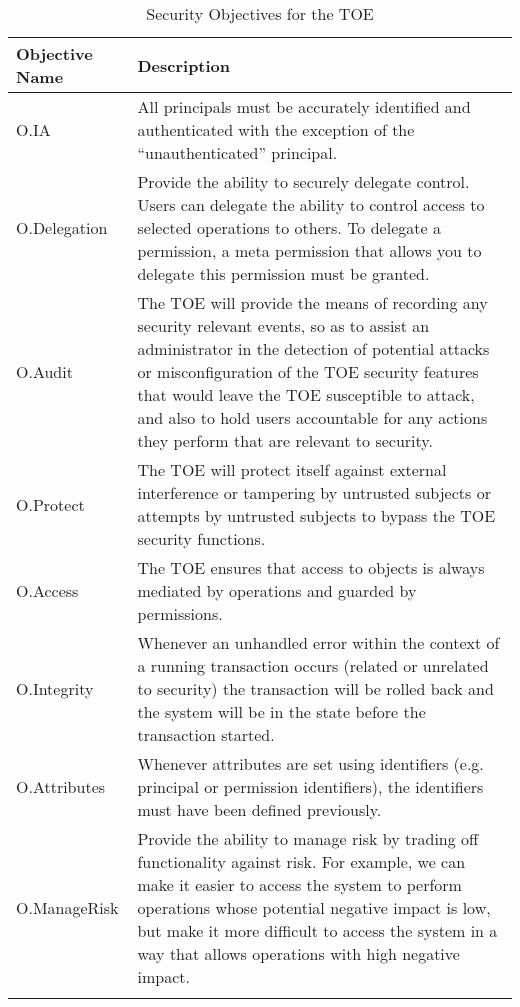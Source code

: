 \documentclass[12pt,english]{scrbook}
\begin{document}
\begin{longtable}[c]{lp{10cm}}
  \toprule
  Objective Name & Description \\
  \midrule\endhead
  
  O.IA
   & 
  All principals must be accurately identified and
  authenticated with the exception of the ``unauthenticated''
  principal.
   \\

  O.Delegation
   & 
  Provide the ability to securely delegate control. Users can
  delegate the ability to control access to selected
  operations to others. To delegate a permission, a meta permission
  that allows you to delegate this permission must be granted.
   \\

  O.Audit
   & 
  The TOE will provide the means of recording any
  security relevant events, so as to assist an
  administrator in the detection of potential attacks
  or misconfiguration of the TOE security features
  that would leave the TOE susceptible to attack, and
  also to hold users accountable for any actions
  they perform that are relevant to security.
   \\

  O.Protect
   & 
  The TOE will protect itself against external
  interference or tampering by untrusted subjects or
  attempts by untrusted subjects to bypass the TOE
  security functions.
   \\

  O.Access
   & 
  The TOE ensures that access to objects is always
  mediated by operations and guarded by permissions.
   \\

  O.Integrity
   & 
  Whenever an unhandled error within the context of a
  running transaction occurs (related or unrelated
  to security) the transaction will be rolled back
  and the system will be in the state before the
  transaction started.
   \\

  O.Attributes
   & 
  Whenever attributes are set using identifiers
  (e.g. principal or permission identifiers), the
  identifiers must have been defined previously.
   \\

  O.ManageRisk
   & 
  Provide the ability to manage risk by trading off
  functionality against risk. For example, we can
  make it easier to access the system to perform
  operations whose potential negative impact is
  low, but make it more difficult to access the
  system in a way that allows operations with high
  negative impact.
  \\
  \bottomrule
  \caption{Security Objectives for the TOE}
\end{longtable}
\end{document}
